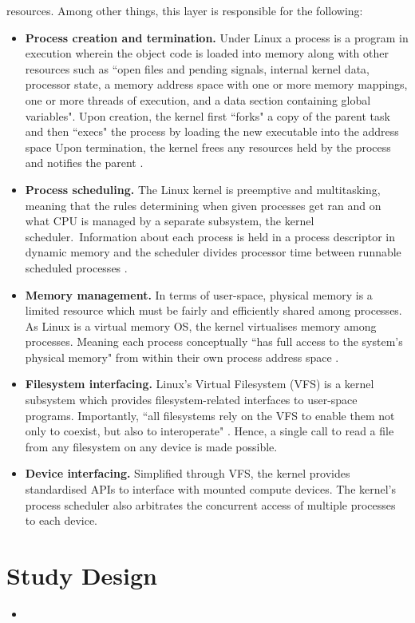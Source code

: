 \documentclass{article}
\begin{document}
resources. Among other things, this layer is responsible for the 
following:
\begin{itemize}
  \item \textbf{Process creation and termination.} Under Linux a process
  is a program in execution wherein the object code is loaded 
  into memory along with other resources such as ``open files and pending signals, internal kernel data, processor state, a memory address space with one or more memory mappings, one or more threads of execution, and a data section containing global variables".
   Upon creation, the kernel first ``forks" 
a copy of the parent task and then ``execs" the process by loading the new
executable into the address space Upon termination, the kernel frees any resources
held by the process and notifies the parent \citep{Love}.
 \item \textbf{Process scheduling.} The Linux kernel is preemptive and multitasking, meaning
 that the rules determining when given processes get ran and on what CPU is managed by
 a separate subsystem, the kernel scheduler.\ Information about each process is held in a
process descriptor in dynamic memory and the scheduler divides processor time 
between runnable scheduled processes \citep{Love7, Kerrisk}.
 \item \textbf{Memory management.} In terms of user-space, 
 physical memory is a limited resource which must be fairly and efficiently shared among
 processes. As Linux is a virtual memory OS, the kernel virtualises memory among processes. 
 Meaning each process conceptually ``has full access to the system's physical memory" 
 from within their own process address space \citep{Love}.
 \item \textbf{Filesystem interfacing.} Linux's Virtual Filesystem (VFS) is a kernel
 subsystem which provides filesystem-related interfaces to user-space programs. Importantly,
 ``all filesystems rely on the VFS to enable them not only to coexist, but also to interoperate"
  \citep{Love}. Hence, a single call to read a file from any filesystem on any device is made possible. 
 \newpage
 \item \textbf{Device interfacing.} Simplified through VFS, the
 kernel provides standardised APIs to interface with mounted compute devices. 
 The kernel's process scheduler also arbitrates the concurrent access of multiple
processes to each device.
\end{itemize}

\section{Study Design}
\lipsum[1]
\begin{itemize}
\item \lipsum[1]
\end{itemize}
\end{document}
